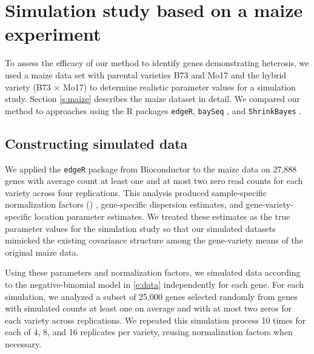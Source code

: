 \documentclass[useAMS,usenatbib,referee]{biom}
\newcommand{\edgeR}{{\tt edgeR}}
\newcommand{\baySeq}{{\tt baySeq}}
\newcommand{\ShrinkBayes}{{\tt ShrinkBayes}}
\begin{document}
\section{Simulation study based on a maize experiment}
\label{s:simulation}

% 

To assess the efficacy of our method to identify genes demonstrating heterosis, we used a maize data set with parental varieties B73 and Mo17 and the hybrid variety (B73 $\times$ Mo17) \citep{paschold2012complementation} to determine realistic parameter values for a simulation study. Section \ref{s:maize} describes the maize dataset in detail. We compared our method to approaches using the R packages \edgeR{}, \baySeq{} \citep{hardcastle2010bayseq, hardcastle2012baySeq}, and \ShrinkBayes{} \citep{van2014shrinkbayes}.

\subsection{Constructing simulated data}
\label{s:sim_data}

We applied the \edgeR{} package \citep{robinson2010edgeR} from Bioconductor \citep{gentleman2004bioconductor} to the maize data on 27,888 genes with average count at least one and at most two zero read counts for each variety across four replications.  This analysis produced  sample-specific normalization factors () %
, gene-specific dispersion estimates, and gene-variety-specific location parameter estimates. We treated these estimates as the true parameter values for the simulation study so that our simulated datasets mimicked the existing covariance structure among the gene-variety means of the original maize data.

Using these parameters and normalization factors, we simulated data according to the negative-binomial model in \eqref{e:data} independently for each gene. For each simulation, we analyzed a subset of 25,000 genes selected randomly from genes with simulated counts at least one on average and with at most two zeros for each variety across replications.  We repeated this simulation process 10 times for each of 4, 8, and 16 replicates per variety, reusing normalization factors when necessary.  
\end{document}
